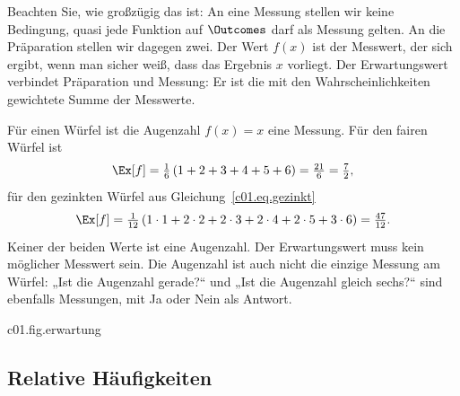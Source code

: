 
Beachten Sie, wie großzügig das ist: An eine Messung stellen wir keine Bedingung, quasi jede
Funktion auf $\Outcomes$ darf als Messung gelten. An die Präparation stellen wir dagegen
zwei. Der Wert $f(x)$ ist der Messwert, der sich ergibt, wenn man sicher weiß, dass das
Ergebnis $x$ vorliegt. Der Erwartungswert verbindet Präparation und Messung: Er ist die mit
den Wahrscheinlichkeiten gewichtete Summe der Messwerte.

\begin{example}[Augenzahl]\label{c01.ex.augenzahl}
  Für einen Würfel ist die Augenzahl $f(x) = x$ eine Messung. Für den fairen Würfel ist
  \begin{equation}\label{c01.eq.augenzahl-fair}
    \Ex[f] = \tfrac16\,(1 + 2 + 3 + 4 + 5 + 6) = \tfrac{21}{6} = \tfrac72 ,
  \end{equation}
  für den gezinkten Würfel aus Gleichung~\eqref{c01.eq.gezinkt}
  \begin{equation}\label{c01.eq.augenzahl-gezinkt}
    \Ex[f] = \tfrac{1}{12}\,(1\cdot 1 + 2\cdot 2 + 2\cdot 3 + 2\cdot 4 + 2\cdot 5 + 3\cdot 6)
           = \tfrac{47}{12} .
  \end{equation}
  Keiner der beiden Werte ist eine Augenzahl. Der Erwartungswert muss kein möglicher
  Messwert sein. Die Augenzahl ist auch nicht die einzige Messung am Würfel: „Ist die
  Augenzahl gerade?“ und „Ist die Augenzahl gleich sechs?“ sind ebenfalls Messungen, mit
  Ja oder Nein als Antwort.
\end{example}

\begin{tpcfigure}{c01.fig.erwartung}
  \caption{Der Erwartungswert der Augenzahl als Schwerpunkt. Denkt man sich die Gewichte
    $\pw(x)$ als Massen an den Stellen $x$ eines Balkens, so ist $\Ex[f]$ die Stelle, an
    der der Balken im Gleichgewicht ist: (a) beim fairen Würfel in der Mitte, bei
    $\tfrac72$; (b) beim gezinkten Würfel aus Gleichung~\eqref{c01.eq.gezinkt} nach rechts
    verschoben, bei $\tfrac{47}{12}$.}
\end{tpcfigure}

\subsection{Relative Häufigkeiten}\label{c01.s2.1}

